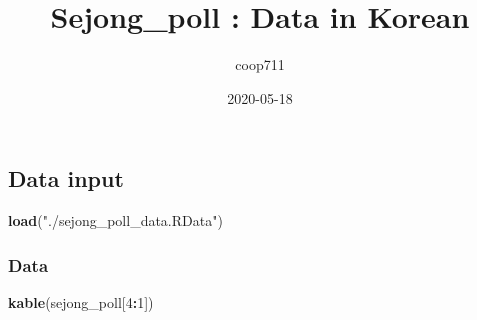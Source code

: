 \documentclass[
]{article}
\title{Sejong\_poll : Data in Korean}
\author{coop711}
\date{2020-05-18}
\newenvironment{Shaded}{\begin{snugshade}}{\end{snugshade}}
\newcommand{\DecValTok}[1]{\textcolor[rgb]{0.00,0.00,0.81}{#1}}
\newcommand{\KeywordTok}[1]{\textcolor[rgb]{0.13,0.29,0.53}{\textbf{#1}}}
\newcommand{\NormalTok}[1]{#1}
\newcommand{\OperatorTok}[1]{\textcolor[rgb]{0.81,0.36,0.00}{\textbf{#1}}}
\newcommand{\StringTok}[1]{\textcolor[rgb]{0.31,0.60,0.02}{#1}}
\begin{document}
\maketitle

\hypertarget{data-input}{%
\subsection{Data input}\label{data-input}}

\begin{Shaded}
\begin{Highlighting}[]
\KeywordTok{load}\NormalTok{(}\StringTok{"./sejong\_poll\_data.RData"}\NormalTok{)}
\end{Highlighting}
\end{Shaded}

\hypertarget{data}{%
\subsubsection{Data}\label{data}}

\begin{Shaded}
\begin{Highlighting}[]
\KeywordTok{kable}\NormalTok{(sejong\_poll[}\DecValTok{4}\OperatorTok{:}\DecValTok{1}\NormalTok{])}
\end{Highlighting}
\end{Shaded}
\end{document}
